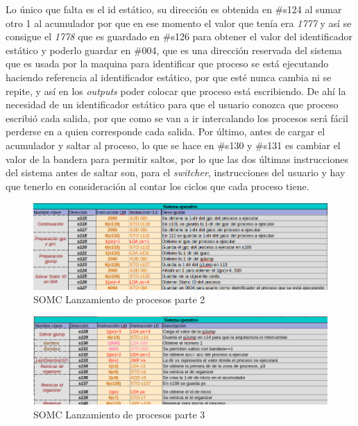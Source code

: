 \documentclass[letterpaper,12pt,oneside]{book}
\begin{document}
		Lo único que falta es el id estático, su dirección es obtenida en \#s124 al sumar otro 1 al acumulador por que en ese momento el valor que tenía
		era \textit{1777} y así se consigue el \textit{1778} que es guardado en \#s126 para obtener el valor del identificador estático y poderlo guardar
		en \#004, que es una dirección reservada del sistema que es usada por la maquina para identificar que proceso se está ejecutando haciendo referencia al
		identificador estático, por que esté nunca cambia ni se repite, y así en los \textit{outputs} poder colocar que proceso está escribiendo. De ahí la necesidad
		de un identificador estático para que el usuario conozca que proceso escribió cada salida, por que como se van a ir intercalando los procesos será fácil
		perderse en a quien corresponde cada salida. Por último, antes de cargar el acumulador y saltar al proceso, lo que se hace en \#s130 y \#s131 es cambiar el valor
		de la bandera para permitir saltos, por lo que las dos últimas instrucciones del sistema antes de saltar son, para el \textit{switcher}, instrucciones
		del usuario y hay que tenerlo en consideración al contar los ciclos que cada proceso tiene.
		
		
		\begin{figure}[h]		
			\centering
			\includegraphics[scale=0.53]{media/CARDIACC/SO_EjecutarProceso2.png}
			\caption{ SOMC Lanzamiento de procesos parte 2 }
			\label{fig:somcLanzamientoP2}
		\end{figure}
		
		\begin{figure}[h]		
			\centering
			\includegraphics[scale=0.53]{media/CARDIACC/SO_EjecutarProceso3.png}
			\caption{ SOMC Lanzamiento de procesos parte 3 }
			\label{fig:somcLanzamientoP3}
		\end{figure}
\end{document}
